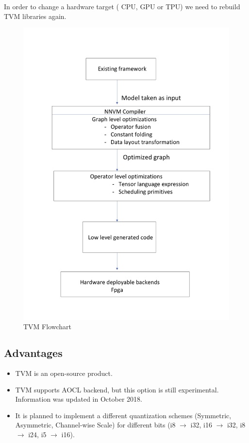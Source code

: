 \documentclass[titlepage]{report}
\begin{document}
In order to change a hardware target ( CPU, GPU or TPU) we need to rebuild TVM libraries again.  

\begin{figure}[h!]
    \centering
    \includegraphics[scale=0.19]{TVM_Flowchart.jpg}
    \caption{TVM Flowchart}
\end{figure}
 
 \subsection{Advantages}
 \begin{itemize}
 \item TVM is an open-source product.
 \item TVM supports AOCL backend, but this option is still experimental. Information was updated in October 2018.
  \item It is planned to implement a different quantization schemes (Symmetric, Asymmetric, Channel-wise Scale) for different bits (i8 $\to$ i32, i16 $\to$ i32, i8 $\to$ i24, i5 $\to$ i16).
 \end{itemize}
\end{document}
